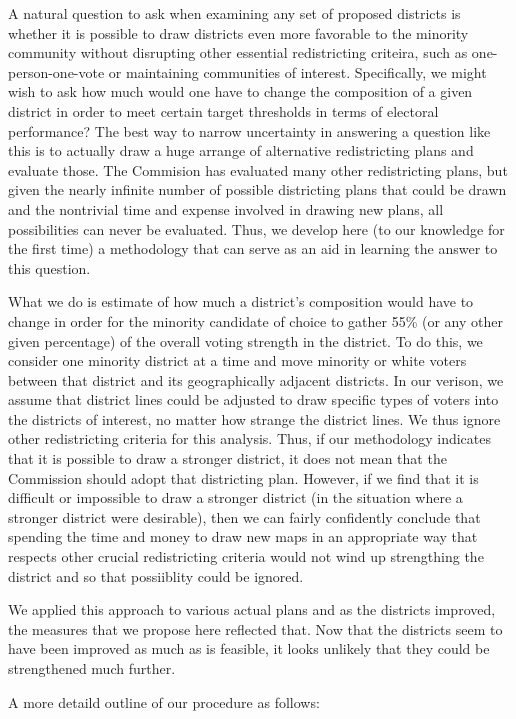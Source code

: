 \documentclass[12pt,draft]{scrartcl}
\begin{document}
A natural question to ask when examining any set of proposed districts
is whether it is possible to draw districts even more favorable to the
minority community without disrupting other essential redistricting
criteira, such as one-person-one-vote or maintaining communities of
interest. Specifically, we might wish to ask how much would one have
to change the composition of a given district in order to meet certain
target thresholds in terms of electoral performance?  The best way to
narrow uncertainty in answering a question like this is to actually
draw a huge arrange of alternative redistricting plans and evaluate
those.  The Commision has evaluated many other redistricting plans,
but given the nearly infinite number of possible districting plans
that could be drawn and the nontrivial time and expense involved in
drawing new plans, all possibilities can never be evaluated.  Thus, we
develop here (to our knowledge for the first time) a methodology that
can serve as an aid in learning the answer to this question.

What we do is estimate of how much a district's composition would have
to change in order for the minority candidate of choice to gather 55\%
(or any other given percentage) of the overall voting strength in the
district.  To do this, we consider one minority district at a time and
move minority or white voters between that district and its
geographically adjacent districts.  In our verison, we assume that
district lines could be adjusted to draw specific types of voters into
the districts of interest, no matter how strange the district lines.
We thus ignore other redistricting criteria for this analysis.  Thus,
if our methodology indicates that it is possible to draw a stronger
district, it does not mean that the Commission should adopt that
districting plan.  However, if we find that it is difficult or
impossible to draw a stronger district (in the situation where a
stronger district were desirable), then we can fairly confidently
conclude that spending the time and money to draw new maps in an
appropriate way that respects other crucial redistricting criteria
would not wind up strengthing the district and so that possiiblity
could be ignored.

We applied this approach to various actual plans and as the districts
improved, the measures that we propose here reflected that.  Now that
the districts seem to have been improved as much as is feasible, it
looks unlikely that they could be strengthened much further.

A more detaild outline of our procedure as follows:
\end{document}
